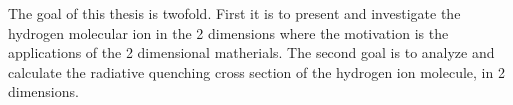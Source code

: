 
The goal of this thesis is twofold. First it is to present and investigate the hydrogen molecular ion in the 2 dimensions where the motivation is the applications of the 2 dimensional matherials.
The second goal is to analyze and calculate the radiative quenching cross section of the hydrogen ion molecule, in 2 dimensions.

